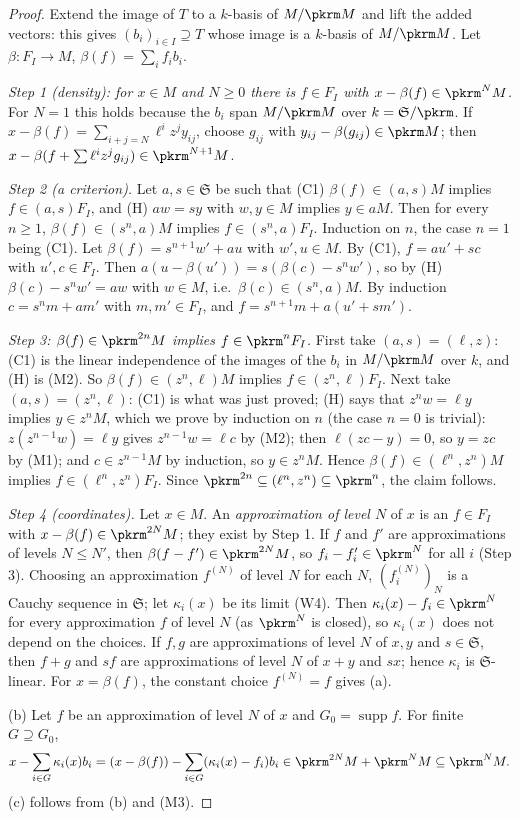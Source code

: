 \documentclass[10pt]{amsart}
\theoremstyle{definition}
\theoremstyle{remark}
\begin{document}
\begin{proof}
Extend the image of $T$ to a $k$-basis of $M/\pkrm M$ and lift the added vectors: this gives
$(b_i)_{i\in I}\supseteq T$ whose image is a $k$-basis of $M/\pkrm M$. Let $\beta\colon F_I\to M$,
$\beta(f)=\sum_if_ib_i$.

\emph{Step 1 (density): for $x\in M$ and $N\ge0$ there is $f\in F_I$ with $x-\beta(f)\in\pkrm^NM$.}
For $N=1$ this holds because the $b_i$ span $M/\pkrm M$ over $k=\mathfrak S/\pkrm$. If $x-\beta(f)=
\sum_{i+j=N}\ell^iz^jy_{ij}$, choose $g_{ij}$ with $y_{ij}-\beta(g_{ij})\in\pkrm M$; then
$x-\beta(f+\sum\ell^iz^jg_{ij})\in\pkrm^{N+1}M$.

\emph{Step 2 (a criterion).} Let $a,s\in\mathfrak S$ be such that (C1) $\beta(f)\in(a,s)M$ implies
$f\in(a,s)F_I$, and (H) $aw=sy$ with $w,y\in M$ implies $y\in aM$. Then for every $n\ge1$,
$\beta(f)\in(s^n,a)M$ implies $f\in(s^n,a)F_I$. Induction on $n$, the case $n=1$ being (C1). Let
$\beta(f)=s^{n+1}w'+au$ with $w',u\in M$. By (C1), $f=au'+sc$ with $u',c\in F_I$. Then
$a(u-\beta(u'))=s(\beta(c)-s^nw')$, so by (H) $\beta(c)-s^nw'=aw$ with $w\in M$, i.e.\ $\beta(c)\in
(s^n,a)M$. By induction $c=s^nm+am'$ with $m,m'\in F_I$, and $f=s^{n+1}m+a(u'+sm')$.

\emph{Step 3: $\beta(f)\in\pkrm^{2n}M$ implies $f\in\pkrm^nF_I$.} First take $(a,s)=(\ell,z)$: (C1) is
the linear independence of the images of the $b_i$ in $M/\pkrm M$ over $k$, and (H) is (M2). So
$\beta(f)\in(z^n,\ell)M$ implies $f\in(z^n,\ell)F_I$. Next take $(a,s)=(z^n,\ell)$: (C1) is what was
just proved; (H) says that $z^nw=\ell y$ implies $y\in z^nM$, which we prove by induction on $n$ (the
case $n=0$ is trivial): $z(z^{n-1}w)=\ell y$ gives $z^{n-1}w=\ell c$ by (M2); then $\ell(zc-y)=0$, so
$y=zc$ by (M1); and $c\in z^{n-1}M$ by induction, so $y\in z^nM$. Hence $\beta(f)\in(\ell^n,z^n)M$
implies $f\in(\ell^n,z^n)F_I$. Since $\pkrm^{2n}\subseteq(\ell^n,z^n)\subseteq\pkrm^n$, the claim
follows.

\emph{Step 4 (coordinates).} Let $x\in M$. An \emph{approximation of level $N$} of $x$ is an $f\in F_I$
with $x-\beta(f)\in\pkrm^{2N}M$; they exist by Step 1. If $f$ and $f'$ are approximations of levels
$N\le N'$, then $\beta(f-f')\in\pkrm^{2N}M$, so $f_i-f'_i\in\pkrm^N$ for all $i$ (Step 3). Choosing an
approximation $f^{(N)}$ of level $N$ for each $N$, $(f^{(N)}_i)_N$ is a Cauchy sequence in $\mathfrak S$;
let $\kappa_i(x)$ be its limit (W4). Then $\kappa_i(x)-f_i\in\pkrm^N$ for every approximation $f$ of
level $N$ (as $\pkrm^N$ is closed), so $\kappa_i(x)$ does not depend on the choices. If $f,g$ are
approximations of level $N$ of $x,y$ and $s\in\mathfrak S$, then $f+g$ and $sf$ are approximations of
level $N$ of $x+y$ and $sx$; hence $\kappa_i$ is $\mathfrak S$-linear. For $x=\beta(f)$, the constant
choice $f^{(N)}=f$ gives (a).

(b) Let $f$ be an approximation of level $N$ of $x$ and $G_0=\operatorname{supp}f$. For finite
$G\supseteq G_0$,
\[x-\sum_{i\in G}\kappa_i(x)b_i=(x-\beta(f))-\sum_{i\in G}(\kappa_i(x)-f_i)b_i\in\pkrm^{2N}M+\pkrm^NM
\subseteq\pkrm^NM.\]
(c) follows from (b) and (M3).
\end{proof}
\end{document}
